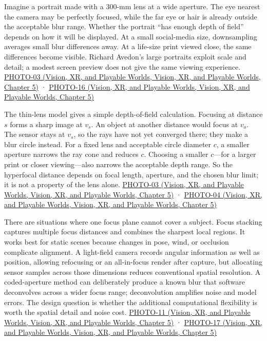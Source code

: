 Imagine a portrait made with a 300-mm lens at a wide aperture. The eye nearest the camera may be perfectly focused, while the far eye or hair is already outside the acceptable blur range. Whether the portrait ``has enough depth of field'' depends on how it will be displayed. At a small social-media size, downsampling averages small blur differences away. At a life-size print viewed close, the same differences become visible. Richard Avedon's large portraits exploit scale and detail; a modest screen preview does not give the same viewing experience. \href{../07-Vision-XR-and-Playable-Worlds/main.pdf\#nameddest=04-visual-computing-ii-ch036-photo-03---photography-session-03}{PHOTO-03 (Vision, XR, and Playable Worlds, Vision, XR, and Playable Worlds, Chapter 5)} · \href{../07-Vision-XR-and-Playable-Worlds/main.pdf\#nameddest=04-visual-computing-ii-ch036-photo-16---photography-session-16}{PHOTO-16 (Vision, XR, and Playable Worlds, Vision, XR, and Playable Worlds, Chapter 5)}

The thin-lens model gives a simple depth-of-field calculation. Focusing at distance \(s\) forms a sharp image at \(v_s\). An object at another distance would focus at \(v_o\). The sensor stays at \(v_s\), so the rays have not yet converged there; they make a blur circle instead. For a fixed lens and acceptable circle diameter \(c\), a smaller aperture narrows the ray cone and reduces \(c\). Choosing a smaller \(c\)---for a larger print or closer viewing---also narrows the acceptable depth range. So the hyperfocal distance depends on focal length, aperture, and the chosen blur limit; it is not a property of the lens alone. \href{../07-Vision-XR-and-Playable-Worlds/main.pdf\#nameddest=04-visual-computing-ii-ch036-photo-03---photography-session-03}{PHOTO-03 (Vision, XR, and Playable Worlds, Vision, XR, and Playable Worlds, Chapter 5)} · \href{../07-Vision-XR-and-Playable-Worlds/main.pdf\#nameddest=04-visual-computing-ii-ch036-photo-04---photography-session-04}{PHOTO-04 (Vision, XR, and Playable Worlds, Vision, XR, and Playable Worlds, Chapter 5)}

There are situations where one focus plane cannot cover a subject. Focus stacking captures multiple focus distances and combines the sharpest local regions. It works best for static scenes because changes in pose, wind, or occlusion complicate alignment. A light-field camera records angular information as well as position, allowing refocusing or an all-in-focus render after capture, but allocating sensor samples across those dimensions reduces conventional spatial resolution. A coded-aperture method can deliberately produce a known blur that software deconvolves across a wider focus range; deconvolution amplifies noise and model errors. The design question is whether the additional computational flexibility is worth the spatial detail and noise cost. \href{../07-Vision-XR-and-Playable-Worlds/main.pdf\#nameddest=04-visual-computing-ii-ch036-photo-11---photography-session-11}{PHOTO-11 (Vision, XR, and Playable Worlds, Vision, XR, and Playable Worlds, Chapter 5)} · \href{../07-Vision-XR-and-Playable-Worlds/main.pdf\#nameddest=04-visual-computing-ii-ch036-photo-17---photography-session-17}{PHOTO-17 (Vision, XR, and Playable Worlds, Vision, XR, and Playable Worlds, Chapter 5)}


